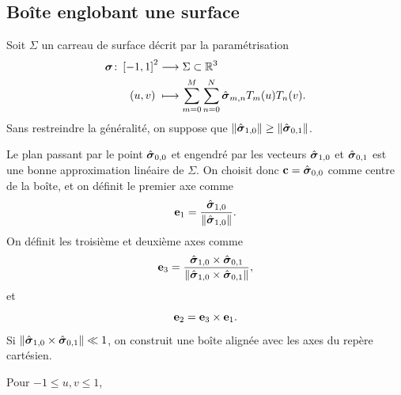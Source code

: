 \subsection{Boîte englobant une surface}
Soit $\Sigma$ un carreau de surface décrit par la paramétrisation 
\begin{align}
  \boldsymbol{\sigma} \colon \left[ -1, 1 \right]^2 &\longrightarrow \Sigma \subset \mathbb{R}^3 \nonumber \\
  (u,v)\; &\longmapsto \sum_{m=0}^{M} \sum_{n=0}^{N} \hat{\boldsymbol{\sigma}}_{m,n} T_m(u) T_n(v).
\end{align}
%
Sans restreindre la généralité, on suppose que $\left\| {\hat{\boldsymbol{\sigma}}_{1,0}} \right\| \geq \left\| {\hat{\boldsymbol{\sigma}}_{0,1}} \right\|$.
\par
Le plan passant par le point $\hat{\boldsymbol{\sigma}}_{0,0}$ et engendré par les vecteurs $\hat{\boldsymbol{\sigma}}_{1,0}$ et $\hat{\boldsymbol{\sigma}}_{0,1}$ est une bonne approximation linéaire de $\Sigma$. 
On choisit donc $\mathbf{c} = \hat{\boldsymbol{\sigma}}_{0,0}$ comme centre de la boîte, et on définit le premier axe comme
\begin{equation}
	\mathbf{e}_1 = \frac{\hat{\boldsymbol{\sigma}}_{1,0}}{\left\| {\hat{\boldsymbol{\sigma}}_{1,0}} \right\|}.
\end{equation}
On définit les troisième et deuxième axes comme 
\begin{equation}
	\mathbf{e}_3 = \frac{{\hat{\boldsymbol{\sigma}}_{1,0}} \times {\hat{\boldsymbol{\sigma}}_{0,1}}}{\left\| {{\hat{\boldsymbol{\sigma}}_{1,0}} \times {\hat{\boldsymbol{\sigma}}_{0,1}}} \right\|},
\end{equation}
et
\begin{equation}
	\mathbf{e}_2 = {\mathbf{e}_3} \times {\mathbf{e}_1}.
\end{equation}
Si $\left\| {{\hat{\boldsymbol{\sigma}}_{1,0}} \times {\hat{\boldsymbol{\sigma}}_{0,1}}} \right\| \ll 1$, on construit une boîte alignée avec les axes du repère cartésien.
\par
Pour $-1 \leq u, v \leq 1$,
